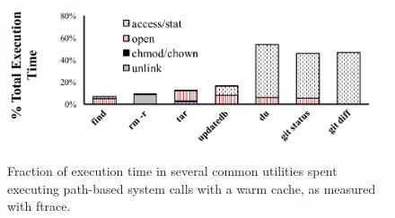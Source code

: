 



\begin{figure}[t]
\scriptsize
\centering
\includegraphics[width=5in]{dcache/plots/syscall-percentage.pdf} \\
\caption[Fraction of execution time on path-based system calls.]
{Fraction of execution time in several common utilities spent
executing path-based system calls with a warm cache, as measured with ftrace.}
\label{fig:dcache:lookup-frac}
\end{figure}


